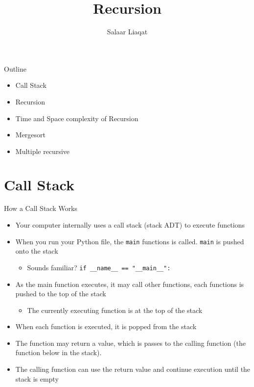 \documentclass[
  ignorenonframetext,
]{beamer}
\title{Recursion}
\author{Salaar Liaqat}
\date{}
\institute{Data Sciences Institute, UofT}
\providecommand{\tightlist}{%
  \setlength{\itemsep}{0pt}\setlength{\parskip}{0pt}}\usepackage{longtable,booktabs,array}
\begin{document}
\frame{\titlepage}
\ifdefined\Shaded\renewenvironment{Shaded}{\begin{tcolorbox}[frame hidden, interior hidden, borderline west={3pt}{0pt}{shadecolor}, enhanced, sharp corners, boxrule=0pt, breakable]}{\end{tcolorbox}}\fi

\begin{frame}{Outline}
\protect\hypertarget{outline}{}
\begin{itemize}
\item
  Call Stack
\item
  Recursion
\item
  Time and Space complexity of Recursion
\item
  Mergesort
\item
  Multiple recursive
\end{itemize}
\end{frame}

\hypertarget{call-stack}{%
\section{Call Stack}\label{call-stack}}

\begin{frame}[fragile]{How a Call Stack Works}
\protect\hypertarget{how-a-call-stack-works}{}
\begin{itemize}
\item
  Your computer internally uses a call stack (stack ADT) to execute
  functions
\item
  When you run your Python file, the \texttt{main} functions is called.
  \texttt{main} is pushed onto the stack

  \begin{itemize}
  \tightlist
  \item
    Sounds familiar? \texttt{if\ \_\_name\_\_\ ==\ "\_\_main\_\_":}
  \end{itemize}
\item
  As the main function executes, it may call other functions, each
  functions is pushed to the top of the stack

  \begin{itemize}
  \tightlist
  \item
    The currently executing function is at the top of the stack
  \end{itemize}
\item
  When each function is executed, it is popped from the stack
\item
  The function may return a value, which is passes to the calling
  function (the function below in the stack).
\item
  The calling function can use the return value and continue execution
  until the stack is empty
\end{itemize}
\end{frame}
\end{document}
